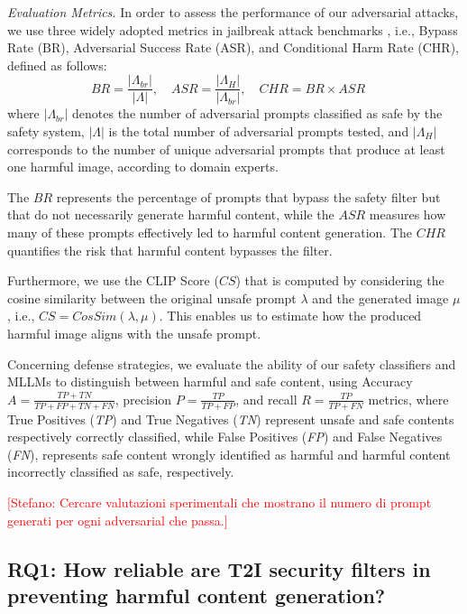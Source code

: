 \documentclass[acmsmall]{acmart}
\newcommand{\ste}[1]{\textcolor{red}{[Stefano: #1]}}
\begin{document}
{\textit{Evaluation Metrics.} In order to assess the performance of our adversarial attacks, we use three widely adopted metrics in jailbreak attack benchmarks \cite{yang2024mma,chin2023prompting4debugging}, i.e., Bypass Rate (BR), Adversarial Success Rate (ASR), and Conditional Harm Rate (CHR), defined as follows:
\begin{equation}
BR = \frac{|\Lambda_{br}|}{|\Lambda|},\quad
ASR = \frac{|\Lambda_H|}{|\Lambda_{br}|},\quad
CHR = BR \times ASR\quad
\end{equation}
where \( |\Lambda_{br}| \) denotes the number of adversarial prompts classified as safe by the safety system, \( |\Lambda| \) is the total number of adversarial prompts tested, and \( |\Lambda_H| \) corresponds to the number of unique adversarial prompts that produce at least one harmful image, according to domain experts.  

The $BR$ represents the percentage of prompts that bypass the safety filter but that do not necessarily generate harmful content, while the $ASR$ measures how many of these prompts effectively led to harmful content generation.
The $CHR$ quantifies the risk that harmful content bypasses the filter.

Furthermore, we use the CLIP Score ($CS$) that is computed by considering the cosine similarity between the original unsafe prompt \( \lambda \) and the generated image \( \mu \), i.e., $CS=CosSim(\lambda,\mu)$. This enables us to estimate how the produced harmful image aligns with the unsafe prompt. 

Concerning defense strategies, we evaluate the ability of our safety classifiers and MLLMs to distinguish between harmful and safe content, using Accuracy $A = \frac{TP + TN}{TP + FP + TN + FN}$, precision $P = \frac{TP}{TP + FP}$, and recall $R = \frac{TP}{TP + FN} $ metrics, where True Positives (\textit{TP}) and True Negatives (\textit{TN}) represent unsafe and safe contents respectively correctly classified, while False Positives (\textit{FP}) and False Negatives (\textit{FN}), 
 represents safe content wrongly identified as harmful and harmful content incorrectly classified as safe, respectively.

\ste{Cercare valutazioni sperimentali che mostrano il numero di prompt generati per ogni adversarial che passa.}

\vspace{-0.1cm}

\subsection{RQ1: How reliable are T2I security filters in preventing harmful content generation? \label{seq:rq1}}

}
\end{document}
